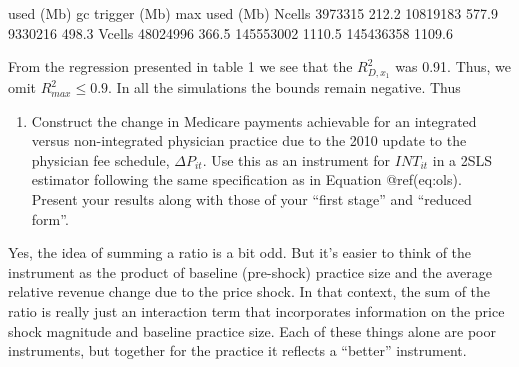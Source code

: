 \documentclass[
  12pt,
]{article}
\providecommand{\tightlist}{%
  \setlength{\itemsep}{0pt}\setlength{\parskip}{0pt}}
\begin{document}
used (Mb) gc trigger (Mb) max used (Mb) Ncells 3973315 212.2 10819183
577.9 9330216 498.3 Vcells 48024996 366.5 145553002 1110.5 145436358
1109.6

From the regression presented in table 1 we see that the \(R^2_{D,x_1}\)
was 0.91. Thus, we omit \(R^2_{max} \leq 0.9\). In all the simulations
the bounds remain negative. Thus

\begin{enumerate}
\def\labelenumi{\arabic{enumi}.}
\setcounter{enumi}{4}
\tightlist
\item
  Construct the change in Medicare payments achievable for an integrated
  versus non-integrated physician practice due to the 2010 update to the
  physician fee schedule, \(\Delta P_{it}\). Use this as an instrument
  for \(INT_{it}\) in a 2SLS estimator following the same specification
  as in Equation @ref(eq:ols). Present your results along with those of
  your ``first stage'' and ``reduced form''.
\end{enumerate}

Yes, the idea of summing a ratio is a bit odd. But it's easier to think
of the instrument as the product of baseline (pre-shock) practice size
and the average relative revenue change due to the price shock. In that
context, the sum of the ratio is really just an interaction term that
incorporates information on the price shock magnitude and baseline
practice size. Each of these things alone are poor instruments, but
together for the practice it reflects a ``better'' instrument.
\end{document}
